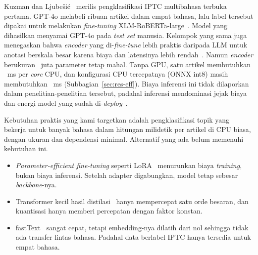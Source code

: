 \documentclass[journal]{IEEEtran}
\newcommand{\eng}[1]{\textit{#1}}   %
\begin{document}
Kuzman dan Ljube\v{s}i\'c~\cite{kuzman2025llm} merilis pengklasifikasi IPTC multibahasa terbuka pertama. GPT-4o melabeli ribuan artikel dalam empat bahasa, lalu label tersebut dipakai untuk melakukan \eng{fine-tuning} XLM-RoBERTa-large~\cite{conneau2020xlmr}. Model yang dihasilkan menyamai GPT-4o pada \eng{test set} manusia. Kelompok yang sama juga menegaskan bahwa \eng{encoder} yang di-\eng{fine-tune} lebih praktis daripada LLM untuk anotasi berskala besar karena biaya dan latensinya lebih rendah~\cite{kuzman2025southslavic}. Namun \eng{encoder} berukuran ~juta parameter tetap mahal. Tanpa GPU, satu artikel membutuhkan ~ms per \eng{core} CPU, dan konfigurasi CPU tercepatnya (ONNX int8) masih membutuhkan ~ms (Subbagian~\ref{sec:res-eff}). Biaya inferensi ini tidak dilaporkan dalam penelitian-penelitian tersebut, padahal inferensi mendominasi jejak biaya dan energi model yang sudah di-\eng{deploy}~\cite{luccioni2024power}.

Kebutuhan praktis yang kami targetkan adalah pengklasifikasi topik yang bekerja untuk banyak bahasa dalam hitungan milidetik per artikel di CPU biasa, dengan ukuran dan dependensi minimal. Alternatif yang ada belum memenuhi kebutuhan ini.
\begin{itemize}
  \item \eng{Parameter-efficient fine-tuning} seperti LoRA~\cite{hu2022lora,razuvayevskaya2024peft} menurunkan biaya \eng{training}, bukan biaya inferensi. Setelah adapter digabungkan, model tetap sebesar \eng{backbone}-nya.
  \item Transformer kecil hasil distilasi~\cite{wang2021minilmv2} hanya mempercepat satu orde besaran, dan kuantisasi hanya memberi percepatan dengan faktor konstan.
  \item fastText~\cite{joulin2017bag} sangat cepat, tetapi embedding-nya dilatih dari nol sehingga tidak ada transfer lintas bahasa. Padahal data berlabel IPTC hanya tersedia untuk empat bahasa.
\end{itemize}
\end{document}
